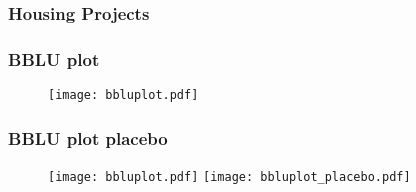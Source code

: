 \documentclass[aspectratio=149]{beamer}
\begin{document}
\begin{frame}
\frametitle{Housing Projects}
\vspace{-1.5mm}
\begin{table}
{\footnotesize

}
\end{table}
\end{frame}


%


\begin{frame}
\frametitle{BBLU plot}
\begin{center}
\begin{figure}
\texttt{[image: bbluplot.pdf]}
\vspace{-3mm}
\end{figure}
\end{center}
\end{frame}



\begin{frame}
\frametitle{BBLU plot placebo}
\begin{center}
\begin{figure}

\texttt{[image: bbluplot.pdf]}
   \hfill
\texttt{[image: bbluplot\_placebo.pdf]}

\end{figure}
\end{center}
\end{frame}





\end{document}
